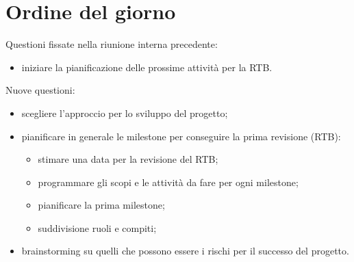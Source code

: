 \documentclass[12pt]{article}
\begin{document}
    \section{Ordine del giorno}
        Questioni fissate nella riunione interna precedente:
    	\begin{itemize}
    		\item iniziare la pianificazione delle prossime attività per la RTB.
    	\end{itemize}
    	Nuove questioni:
    	\begin{itemize}
    		\item scegliere l'approccio per lo sviluppo del progetto;
    		\item pianificare in generale le milestone per conseguire la prima revisione (RTB):
    		\begin{itemize}
				\item stimare una data per la revisione del RTB;
				\item programmare gli scopi e le attività da fare per ogni milestone;
				\item pianificare la prima milestone;
				\item suddivisione ruoli e compiti;
			\end{itemize}
			\item brainstorming su quelli che possono essere i rischi per il successo del progetto.
    	\end{itemize}
    
\end{document}
